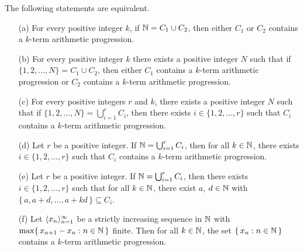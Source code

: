 \begin{thm}
  \label{thm:vdwEqSyn}
  The following statements are equivalent.
  \begin{itemize}
    \item[(a)]
      For every positive integer $k$, if $\mathbb{N} = C_1 \cup C_2$, then either $C_1$ or $C_2$ contains a $k$-term arithmetic progression. 

    \item[(b)]
      For every positive integer $k$ there exists a positive integer $N$ such that if $\{1, 2, \ldots, N\} = C_1 \cup C_2$, then either $C_1$ contains a $k$-term arithmetic progression or $C_2$ contains a $k$-term arithmetic progression.

    \item[(c)]
      For every positive integers $r$ and $k$, there exists a positive integer $N$ such that if $\{1, 2, \ldots, N\} = \bigcup_{i=1}^r C_i$, then there exists $i \in \{1, 2, \ldots, r\}$ such that $C_i$ contains a $k$-term arithmetic progression.

    \item[(d)]
      Let $r$ be a positive integer.
      If $\mathbb{N} = \bigcup_{i=1}^r C_i$, then for all $k \in \mathbb{N}$, there exists $i \in \{1, 2, \ldots, r\}$ such that $C_i$ contains a $k$-term arithmetic progression.

    \item[(e)]
      Let $r$ be a positive integer.
      If $\mathbb{N} = \bigcup_{i=1}^r C_i$, then there exists $i \in \{1, 2, \ldots, r\}$ such that for all $k \in \mathbb{N}$, there exist $a$, $d \in \mathbb{N}$ with $\{\, a, a+d, \ldots, a+k d \,\} \subseteq C_i$. 
      
    \item[(f)] 
      Let $\langle x_n \rangle_{n=1}^\infty$ be a strictly increasing sequence in $\mathbb{N}$ with $\max\{\, x_{n+1} - x_n : n \in \mathbb{N} \,\}$ finite.
      Then for all $k \in \mathbb{N}$, the set $\{\, x_n : n \in \mathbb{N} \,\}$ contains a $k$-term arithmetic progression.
  \end{itemize}
\end{thm}
